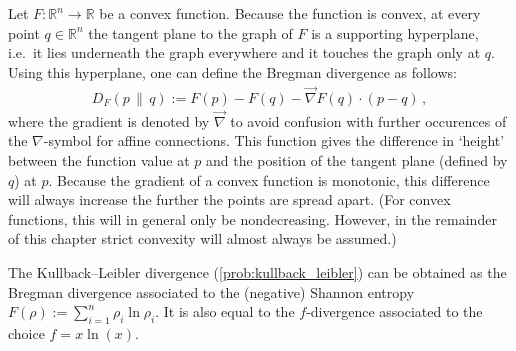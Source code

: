     \begin{definition}\label{info:bregman_divergence}
        Let $F:\mathbb{R}^n\rightarrow\mathbb{R}$ be a convex function. Because the function is convex, at every point $q\in\mathbb{R}^n$ the tangent plane to the graph of $F$ is a supporting hyperplane, i.e.~it lies underneath the graph everywhere and it touches the graph only at $q$. Using this hyperplane, one can define the Bregman divergence as follows:
        \begin{gather}
            D_F(p\,\|\,q) := F(p) - F(q) - \vec{\nabla}F(q)\cdot(p-q)\,,
        \end{gather}
        where the gradient is denoted by $\vec{\nabla}$ to avoid confusion with further occurences of the $\nabla$-symbol for affine connections. This function gives the difference in `height' between the function value at $p$ and the position of the tangent plane (defined by $q$) at $p$. Because the gradient of a convex function is monotonic, this difference will always increase the further the points are spread apart. (For convex functions, this will in general only be nondecreasing. However, in the remainder of this chapter strict convexity will almost always be assumed.)
    \end{definition}
    \begin{example}
        The Kullback--Leibler divergence (\cref{prob:kullback_leibler}) can be obtained as the Bregman divergence associated to the (negative) Shannon entropy $F(\rho) := \sum_{i=1}^n\rho_i\ln\rho_i$. It is also equal to the $f$-divergence associated to the choice $f=x\ln(x)$.
    \end{example}

